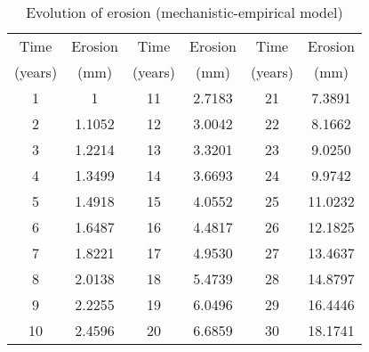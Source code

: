\begin{table}
	\caption{Evolution of erosion (mechanistic-empirical model)} \label{tbl:36}
\begin{tabular}{|l|l|l|l|l|l|}
\hline
\multicolumn{1}{|c|}{Time} & \multicolumn{1}{c|}{Erosion} & \multicolumn{1}{c|}{Time} & \multicolumn{1}{c|}{Erosion} & \multicolumn{1}{c|}{Time} & \multicolumn{1}{c|}{Erosion} \\ 
\multicolumn{1}{|c|}{(years)} & \multicolumn{1}{c|}{(mm)} & \multicolumn{1}{c|}{(years)} & \multicolumn{1}{c|}{(mm)} & \multicolumn{1}{c|}{(years)} & \multicolumn{1}{c|}{(mm)} \\ 
\hline
\multicolumn{1}{|c|}{1} & \multicolumn{1}{c|}{1} & \multicolumn{1}{c|}{11} & \multicolumn{1}{c|}{2.7183} & \multicolumn{1}{c|}{21} & \multicolumn{1}{c|}{7.3891} \\ 
\hline
\multicolumn{1}{|c|}{2} & \multicolumn{1}{c|}{1.1052} & \multicolumn{1}{c|}{12} & \multicolumn{1}{c|}{3.0042} & \multicolumn{1}{c|}{22} & \multicolumn{1}{c|}{8.1662} \\ 
\hline
\multicolumn{1}{|c|}{3} & \multicolumn{1}{c|}{1.2214} & \multicolumn{1}{c|}{13} & \multicolumn{1}{c|}{3.3201} & \multicolumn{1}{c|}{23} & \multicolumn{1}{c|}{9.0250} \\ 
\hline
\multicolumn{1}{|c|}{4} & \multicolumn{1}{c|}{1.3499} & \multicolumn{1}{c|}{14} & \multicolumn{1}{c|}{3.6693} & \multicolumn{1}{c|}{24} & \multicolumn{1}{c|}{9.9742} \\ 
\hline
\multicolumn{1}{|c|}{5} & \multicolumn{1}{c|}{1.4918} & \multicolumn{1}{c|}{15} & \multicolumn{1}{c|}{4.0552} & \multicolumn{1}{c|}{25} & \multicolumn{1}{c|}{11.0232} \\ 
\hline
\multicolumn{1}{|c|}{6} & \multicolumn{1}{c|}{1.6487} & \multicolumn{1}{c|}{16} & \multicolumn{1}{c|}{4.4817} & \multicolumn{1}{c|}{26} & \multicolumn{1}{c|}{12.1825} \\ 
\hline
\multicolumn{1}{|c|}{7} & \multicolumn{1}{c|}{1.8221} & \multicolumn{1}{c|}{17} & \multicolumn{1}{c|}{4.9530} & \multicolumn{1}{c|}{27} & \multicolumn{1}{c|}{13.4637} \\ 
\hline
\multicolumn{1}{|c|}{8} & \multicolumn{1}{c|}{2.0138} & \multicolumn{1}{c|}{18} & \multicolumn{1}{c|}{5.4739} & \multicolumn{1}{c|}{28} & \multicolumn{1}{c|}{14.8797} \\ 
\hline
\multicolumn{1}{|c|}{9} & \multicolumn{1}{c|}{2.2255} & \multicolumn{1}{c|}{19} & \multicolumn{1}{c|}{6.0496} & \multicolumn{1}{c|}{29} & \multicolumn{1}{c|}{16.4446} \\ 
\hline
\multicolumn{1}{|c|}{10} & \multicolumn{1}{c|}{2.4596} & \multicolumn{1}{c|}{20} & \multicolumn{1}{c|}{6.6859} & \multicolumn{1}{c|}{30} & \multicolumn{1}{c|}{18.1741} \\ 
\hline
\end{tabular}
\end{table}

